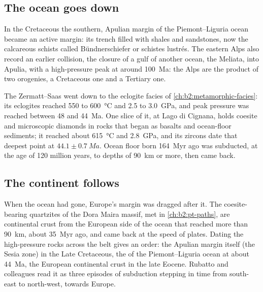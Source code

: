 \subsection*{The ocean goes down}

In the Cretaceous the southern, Apulian margin of the Piemont--Liguria ocean became an
active margin: its trench filled with shales and sandstones, now the calcareous schists
called Bündnerschiefer or schistes lustrés. The eastern Alps also record an earlier
collision, the closure of a gulf of another ocean, the Meliata, into Apulia, with a
high-pressure peak at around \qty{100}{Ma}: the Alps are the product of two orogenies, a
Cretaceous one and a Tertiary one.

The Zermatt--Saas  went down to the eclogite facies of
\cref{ch:b2:metamorphic-facies}: its eclogites reached 550 to \qty{600}{\celsius} and 2.5 to
\qty{3.0}{GPa}, and peak pressure was reached between 48 and \qty{44}{Ma}. One slice of it,
at Lago di Cignana, holds coesite and microscopic diamonds in rocks that began as basalts
and ocean-floor sediments; it reached about \qty{615}{\celsius} and \qty{2.8}{GPa}, and its
zircons date that deepest point at $44.1 \pm \qty{0.7}{Ma}$. Ocean floor born
\qty{164}{Myr} ago was subducted, at the age of 120 million years, to depths of
\qty{90}{km} or more, then came back.

\subsection*{The continent follows}

When the ocean had gone, Europe's margin was dragged after it. The coesite-bearing
quartzites of the Dora Maira massif, met in \cref{ch:b2:pt-paths}, are continental crust
from the European side of the ocean that reached more than \qty{90}{km}, about
\qty{35}{Myr} ago, and came back at the speed of plates. Dating the high-pressure rocks
across the belt gives an order: the Apulian margin itself (the Sesia zone) in the Late
Cretaceous, the  of the Piemont--Liguria ocean at about \qty{44}{Ma}, the
European continental crust in the late Eocene. Rubatto and colleagues read it as three episodes of subduction stepping in time from
south-east to north-west, towards Europe.

